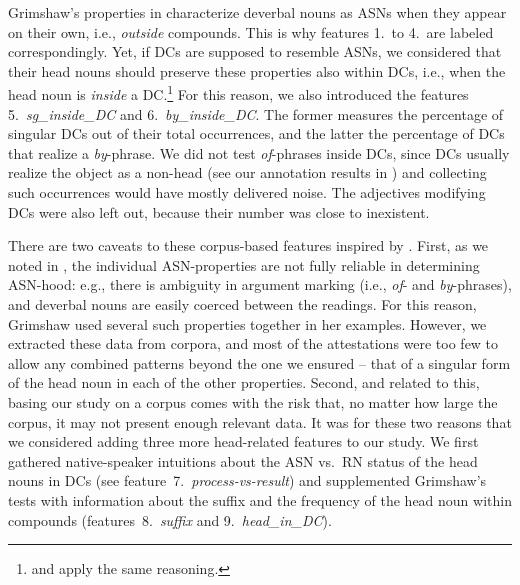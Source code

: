 \documentclass[output=paper]{langsci/langscibook}
\begin{document}
Grimshaw's properties in  characterize deverbal nouns as ASNs when they appear on their own, i.e., \textit{outside} compounds. This is why features 1.~to 4.~are labeled correspondingly. Yet, if DCs are supposed to resemble ASNs, we considered that their head nouns should preserve these properties also within DCs, i.e., when the head noun is \textit{inside} a DC.\footnote{\cite{disciullo:92} and \cite{borer:13}  apply the same reasoning.} For this reason, we also introduced the features 5.~\textit{sg\_inside\_DC} and 6.~\textit{by\_inside\_DC}. The former measures the percentage of singular DCs out of their total occurrences, and the latter the percentage of DCs that realize a \textit{by}-phrase. We did not test \textit{of}-phrases inside DCs, since DCs usually realize the object as a non-head (see our annotation results in ) and collecting such occurrences would have mostly delivered noise. The adjectives modifying DCs were also left out, because their number was close to inexistent.

There are two caveats to these corpus-based features inspired by \cite{grimshaw:90}. First, as we noted in , the individual ASN-properties are not fully reliable in determining ASN-hood: e.g., there is ambiguity in argument marking (i.e., \textit{of}- and \textit{by}-phrases), and  deverbal nouns are easily coerced between the readings. For this reason, Grimshaw used several such properties together in her examples. However, we extracted these data from corpora, and most of the attestations were too few to allow any combined patterns beyond the one we ensured -- that of a singular form of the head noun in each of the other properties. Second, and related to this, basing our study on a corpus comes with the risk that, no matter how large the corpus, it may not present enough relevant data. It was for these two reasons that we considered adding three more head-related features to our study. We first gathered native-speaker intuitions about the ASN vs.~RN status of the head nouns in DCs (see  feature~7.~\textit{process-vs-result}) and supplemented Grimshaw's tests with information about the suffix  and the frequency of  the head noun within compounds (features~8.~\textit{suffix} and 9.~\textit{head\_in\_DC}).
\end{document}
